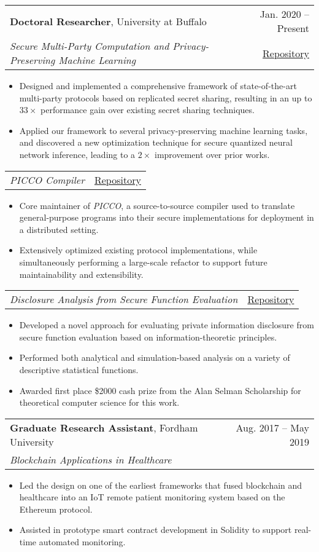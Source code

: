\documentclass[letterpaper,11pt]{article}
\makeatletter
\newcommand{\resumeItem}[1]{
    \item\small{
        {#1 \vspace{-2pt}}
    }
}
\newcommand{\resumeSubheadingDesc}[6]{
    \vspace{-2pt}\item
    \begin{tabular*}{0.97\textwidth}[t]{l@{\extracolsep{\fill}}r}
        \textbf{#1}, #2 & #3 \\
        \textit{\small#4} {\small#5} & {\small #6} 
    \end{tabular*}\vspace{-7pt}
}
\newcommand{\resumeSubSubheading}[2]{
    \item
    \begin{tabular*}{0.97\textwidth}{l@{\extracolsep{\fill}}r}
        \textit{\small#1} & {\small #2} \\
    \end{tabular*}\vspace{-7pt}
}
\newcommand{\resumeItemListStart}{\begin{itemize}[leftmargin=0.20in]}
\newcommand{\resumeItemListEnd}{\end{itemize}\vspace{-5pt}}
\makeatother
\begin{document}
\resumeSubheadingDesc
{Doctoral Researcher}{University at Buffalo}{Jan. 2020 -- Present}
{Secure Multi-Party Computation and Privacy-Preserving Machine Learning}{}{
    \href{https://github.com/anbaccar/RSS_ring_ppml}{{Repository}}
}
\resumeItemListStart
\resumeItem{Designed and implemented a comprehensive framework of state-of-the-art multi-party protocols based on replicated secret sharing, resulting in an up to $33 \times $ performance gain over existing secret sharing techniques.}
\resumeItem{Applied our framework to several privacy-preserving machine learning tasks, and discovered a new optimization technique for secure quantized neural network inference, leading to a $2\times$ improvement over prior works.}
\resumeItemListEnd
\resumeSubSubheading
{PICCO Compiler}{
    \href{https://github.com/applied-crypto-lab/picco}{{Repository}}
}
\resumeItemListStart
\resumeItem{Core maintainer of \emph{PICCO}, a source-to-source compiler used to translate general-purpose programs into their secure implementations for deployment in a distributed setting.}
\resumeItem{Extensively optimized existing protocol implementations, while simultaneously performing a large-scale refactor to support future maintainability and extensibility.}
\resumeItemListEnd
\resumeSubSubheading
{Disclosure Analysis from Secure Function Evaluation}{
\href{https://github.com/anbaccar/estimators}{{Repository}}
}
\resumeItemListStart
\resumeItem{Developed a novel approach for evaluating private information disclosure from secure function evaluation based on information-theoretic principles.}
\resumeItem{Performed both analytical and simulation-based analysis on a variety of descriptive statistical functions.}
\resumeItem{Awarded first place \$2000 cash prize from the Alan Selman Scholarship for theoretical computer science for this work.}
\resumeItemListEnd

\resumeSubheadingDesc
{Graduate Research Assistant}{Fordham University}{Aug. 2017 -- May 2019}
{Blockchain Applications in Healthcare}{}{}
\resumeItemListStart
\resumeItem{Led the design on one of the earliest frameworks that fused blockchain and healthcare into an IoT remote patient monitoring system based on the Ethereum protocol.}
\resumeItem{Assisted in prototype smart contract development in Solidity to support real-time automated monitoring.}
\resumeItemListEnd
\end{document}
